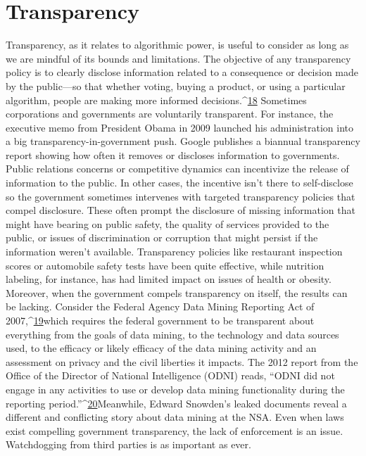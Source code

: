 \chapter{Transparency }
Transparency, as it relates to algorithmic power, is useful to consider as long as we are mindful of its bounds and limitations. The objective of any transparency policy is to clearly disclose information related to a consequence or decision made by the public—so that whether voting, buying a product, or using a particular algorithm, people are making more informed decisions.^{\href{#endnotes}{18}}
Sometimes corporations and governments are voluntarily transparent. For instance, the executive memo from President Obama in 2009 launched his administration into a big transparency-in-government push. Google publishes a biannual transparency report showing how often it removes or discloses information to governments. Public relations concerns or competitive dynamics can incentivize the release of information to the public. In other cases, the incentive isn't there to self-disclose so the government sometimes intervenes with targeted transparency policies that compel disclosure. These often prompt the disclosure of missing information that might have bearing on public safety, the quality of services provided to the public, or issues of discrimination or corruption that might persist if the information weren't available. 
Transparency policies like restaurant inspection scores or automobile safety tests have been quite effective, while nutrition labeling, for instance, has had limited impact on issues of health or obesity. Moreover, when the government compels transparency on itself, the results can be lacking. Consider the Federal Agency Data Mining Reporting Act of 2007,^{\href{#endnotes}{19}}which requires the federal government to be transparent about everything from the goals of data mining, to the technology and data sources used, to the efficacy or likely efficacy of the data mining activity and an assessment on privacy and the civil liberties it impacts. The 2012 report from the Office of the Director of National Intelligence (ODNI) reads, ``ODNI did not engage in any activities to use or develop data mining functionality during the reporting period.''^{\href{#endnotes}{20}}Meanwhile, Edward Snowden's leaked documents reveal a different and conflicting story about data mining at the NSA. Even when laws exist compelling government transparency, the lack of enforcement is an issue. Watchdogging from third parties is as important as ever. 
